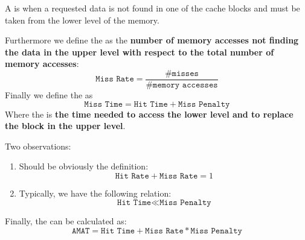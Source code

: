\begin{definitionbox}
    A  is when a requested data is not found in one of the cache blocks and must be taken from the lower level of the memory.
\end{definitionbox}

\noindent
Furthermore we define the  as the \textbf{number of memory accesses not finding the data in the upper level with respect to the total number of memory accesses}:
\begin{equation}\label{eq: Miss Rate}
    \texttt{Miss Rate} = \dfrac{\texttt{\# misses}}{\texttt{\# memory accesses}}
\end{equation}
Finally we define the  as
\begin{equation}\label{eq: Miss Time}
    \texttt{Miss Time} = \texttt{Hit Time} + \texttt{Miss Penalty}
\end{equation}
Where the  is \textbf{the time needed to access the lower level and to replace the block in the upper level}.

\highspace
Two observations:
\begin{enumerate}
    \item Should be obviously the definition:
    \begin{equation*}
        \texttt{Hit Rate} + \texttt{Miss Rate} = 1
    \end{equation*}

    \item Typically, we have the following relation:
    \begin{equation*}
        \texttt{Hit Time} \ll \texttt{Miss Penalty}
    \end{equation*}
\end{enumerate}
Finally, the  can be calculated as:
\begin{equation}\label{eq: Average Memory Access Time (AMAT)}
    \texttt{AMAT} = \texttt{Hit Time} + \texttt{Miss Rate} * \texttt{Miss Penalty}
\end{equation}